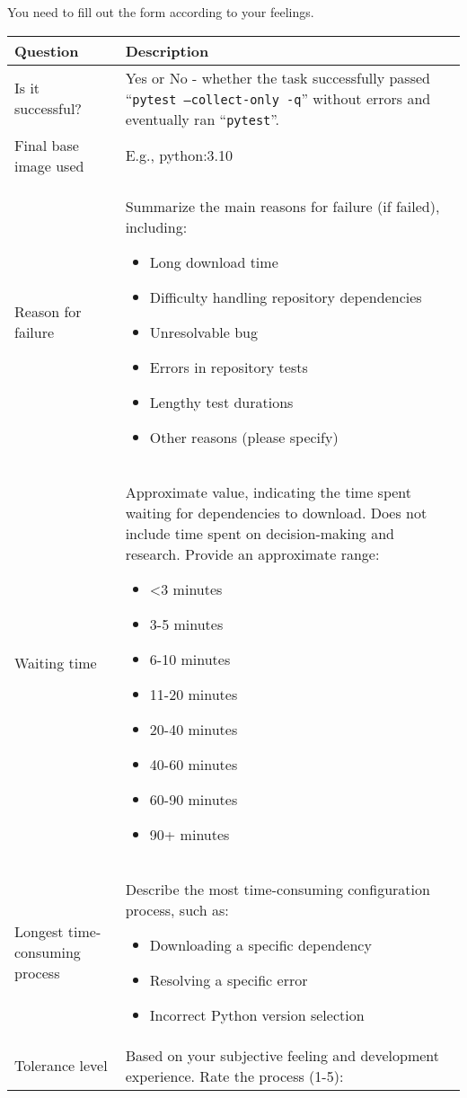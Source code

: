 You need to fill out the form according to your feelings.
\begin{longtable}{|l|p{10cm}|}
\hline
\textbf{Question} & \textbf{Description} \\
\hline
Is it successful? & Yes or No - whether the task successfully passed ``\texttt{pytest --collect-only -q}'' without errors and eventually ran ``\texttt{pytest}''. \\
\hline
Final base image used & E.g., python:3.10 \\
\hline
Reason for failure & Summarize the main reasons for failure (if failed), including:
\begin{itemize}
    \item Long download time
    \item Difficulty handling repository dependencies
    \item Unresolvable bug
    \item Errors in repository tests
    \item Lengthy test durations
    \item Other reasons (please specify)
\end{itemize} \\
\hline
Waiting time & Approximate value, indicating the time spent waiting for dependencies to download. Does not include time spent on decision-making and research. Provide an approximate range: 
\begin{itemize}
    \item <3 minutes
    \item 3-5 minutes
    \item 6-10 minutes
    \item 11-20 minutes
    \item 20-40 minutes
    \item 40-60 minutes
    \item 60-90 minutes
    \item 90+ minutes
\end{itemize} \\
\hline
Longest time-consuming process & Describe the most time-consuming configuration process, such as:
\begin{itemize}
    \item Downloading a specific dependency
    \item Resolving a specific error
    \item Incorrect Python version selection
\end{itemize} \\
\hline
Tolerance level & Based on your subjective feeling and development experience. Rate the process (1-5):

\end{longtable}
